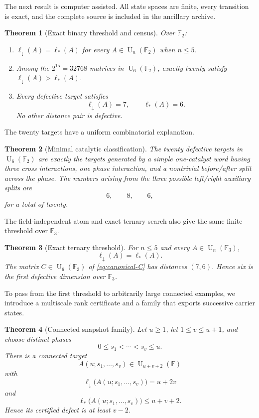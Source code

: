 \documentclass[11pt]{amsart}
\numberwithin{equation}{section}
\newtheorem{theorem}{Theorem}[section]
\theoremstyle{definition}
\theoremstyle{remark}
\newcommand{\F}{\mathbb F}
\newcommand{\U}{\operatorname{U}}
\newcommand{\ellDown}{\ell_{\downarrow}}
\newcommand{\ellAll}{\ell_{*}}
\begin{document}
The next result is computer assisted.  All state spaces are finite, every transition is exact, and the complete source is included in the ancillary archive.

\begin{theorem}[Exact binary threshold and census]\label{thm:binary-census}
Over $\F_2$:
\begin{enumerate}[label=\textup{(\roman*)}]
\item $\ellDown(A)=\ellAll(A)$ for every $A\in\U_n(\F_2)$ when $n\le5$.
\item Among the $2^{15}=32768$ matrices in $\U_6(\F_2)$, exactly twenty satisfy $\ellDown(A)>\ellAll(A)$.
\item Every defective target satisfies
\[
\ellDown(A)=7,
\qquad
\ellAll(A)=6.
\]
No other distance pair is defective.
\end{enumerate}
\end{theorem}

The twenty targets have a uniform combinatorial explanation.

\begin{theorem}[Minimal catalytic classification]\label{thm:motif-classification}
The twenty defective targets in $\U_6(\F_2)$ are exactly the targets generated by a simple one-catalyst word having three cross interactions, one phase interaction, and a nontrivial before/after split across the phase.  The numbers arising from the three possible left/right auxiliary splits are
\[
6,
\qquad
8,
\qquad
6,
\]
for a total of twenty.
\end{theorem}

The field-independent atom and exact ternary search also give the same finite threshold over $\F_3$.

\begin{theorem}[Exact ternary threshold]\label{thm:ternary-threshold}
For $n\le5$ and every $A\in\U_n(\F_3)$,
\[
\ellDown(A)=\ellAll(A).
\]
The matrix $C\in\U_6(\F_3)$ of \cref{eq:canonical-C} has distances $(7,6)$.  Hence six is the first defective dimension over $\F_3$.
\end{theorem}

To pass from the first threshold to arbitrarily large connected examples, we introduce a multiscale rank certificate and a family that exports successive carrier states.

\begin{theorem}[Connected snapshot family]\label{thm:snapshot-family}
Let $u\ge1$, let $1\le v\le u+1$, and choose distinct phases
\[
0\le s_1<\cdots<s_v\le u.
\]
There is a connected target
\[
A(u;s_1,\ldots,s_v)\in\U_{u+v+2}(\F)
\]
with
\[
\ellDown\bigl(A(u;s_1,\ldots,s_v)\bigr)=u+2v
\]
and
\[
\ellAll\bigl(A(u;s_1,\ldots,s_v)\bigr)\le u+v+2.
\]
Hence its certified defect is at least $v-2$.
\end{theorem}
\end{document}
